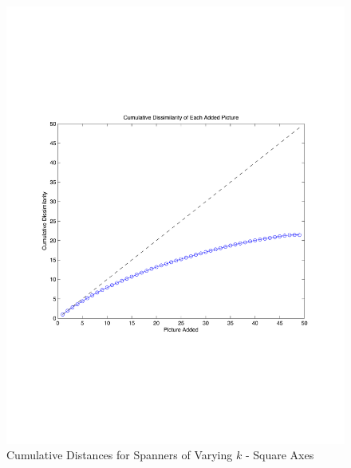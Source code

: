 \begin{figure} 
\begin{centering}
    \includegraphics[scale=0.35]{figures/spannerCumulativeDistSquare.pdf}
    \caption{Cumulative Distances for Spanners of Varying $k$ - Square Axes}
    \label{fig:spanCumDist}
\end{centering}
\end{figure}





